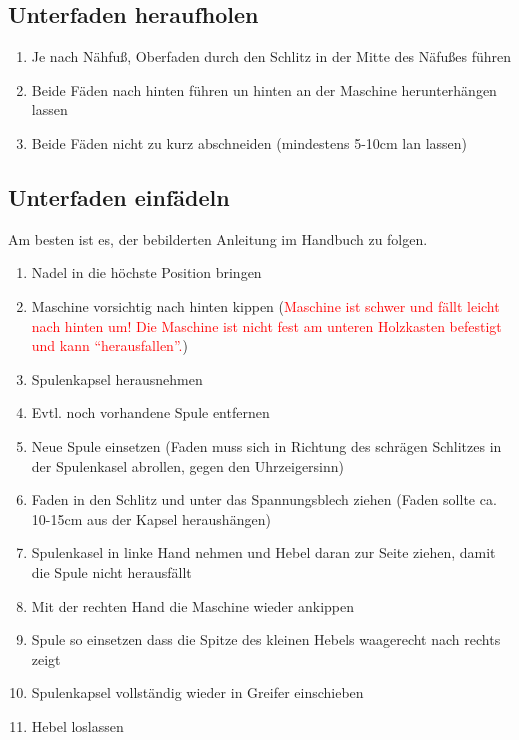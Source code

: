 \documentclass{\basedir/fablab-document}
\begin{document}
\subsection{Unterfaden heraufholen}
\begin{enumerate}
	\item Je nach Nähfuß, Oberfaden durch den Schlitz in der Mitte des Näfußes führen
	\item Beide Fäden nach hinten führen un hinten an der Maschine herunterhängen lassen
	\item Beide Fäden nicht zu kurz abschneiden (mindestens 5-10cm lan lassen)
\end{enumerate}

\subsection{Unterfaden einfädeln}

Am besten ist es, der bebilderten Anleitung im Handbuch zu folgen.

\vspace{1em}
\begin{enumerate}
 \item Nadel in die höchste Position bringen
 \item Maschine vorsichtig nach hinten kippen (\textcolor{red}{Maschine ist schwer und fällt leicht nach hinten um! Die Maschine ist nicht fest am unteren Holzkasten befestigt und kann \enquote{herausfallen}.})
 \item Spulenkapsel herausnehmen
 \item Evtl. noch vorhandene Spule entfernen
 \item Neue Spule einsetzen (Faden muss sich in Richtung des schrägen Schlitzes in der Spulenkasel abrollen, gegen den Uhrzeigersinn)
 \item Faden in den Schlitz und unter das Spannungsblech ziehen (Faden sollte ca. 10-15cm aus der Kapsel heraushängen)
 \item Spulenkasel in linke Hand nehmen und Hebel daran zur Seite ziehen, damit die Spule nicht herausfällt
 \item Mit der rechten Hand die Maschine wieder ankippen
 \item Spule so einsetzen dass die Spitze des kleinen Hebels waagerecht nach rechts zeigt
 \item Spulenkapsel vollständig wieder in Greifer einschieben
 \item Hebel loslassen
\end{enumerate}

\newpage
{}
\end{document}
